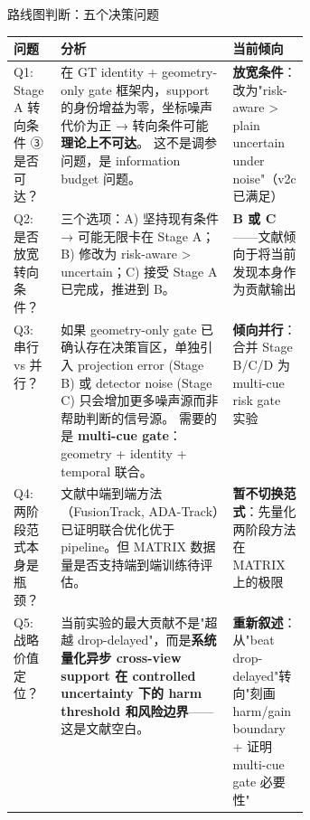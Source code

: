 \documentclass[aspectratio=169,xcolor=dvipsnames]{beamer}
\newcommand{\metric}[1]{\textbf{#1}}
\begin{document}

\begin{frame}{路线图判断：五个决策问题}
\scriptsize
\vspace{-2mm}
\begin{tabularx}{\linewidth}{p{0.16\linewidth} X p{0.22\linewidth}}
\toprule
问题 & 分析 & 当前倾向 \\
\midrule
Q1: Stage A 转向条件 ③ 是否可达？ &
在 GT identity + geometry-only gate 框架内，support 的身份增益为零，坐标噪声代价为正 → 转向条件可能\textbf{理论上不可达}。
这不是调参问题，是 information budget 问题。 &
\metric{放宽条件}：改为"risk-aware > plain uncertain under noise"（v2c 已满足） \\
\addlinespace
Q2: 是否放宽转向条件？ &
三个选项：A) 坚持现有条件 → 可能无限卡在 Stage A；B) 修改为 risk-aware > uncertain；C) 接受 Stage A 已完成，推进到 B。 &
\metric{B 或 C}——文献倾向于将当前发现本身作为贡献输出 \\
\addlinespace
Q3: 串行 vs 并行？ &
如果 geometry-only gate 已确认存在决策盲区，单独引入 projection error (Stage B) 或 detector noise (Stage C) 只会增加更多噪声源而非帮助判断的信号源。
需要的是 \textbf{multi-cue gate}：geometry + identity + temporal 联合。 &
\metric{倾向并行}：合并 Stage B/C/D 为 multi-cue risk gate 实验 \\
\addlinespace
Q4: 两阶段范式本身是瓶颈？ &
文献中端到端方法（FusionTrack, ADA-Track）已证明联合优化优于 pipeline。但 MATRIX 数据量是否支持端到端训练待评估。 &
\metric{暂不切换范式}：先量化两阶段方法在 MATRIX 上的极限 \\
\addlinespace
Q5: 战略价值定位？ &
当前实验的最大贡献不是"超越 drop-delayed"，而是\textbf{系统量化异步 cross-view support 在 controlled uncertainty 下的 harm threshold 和风险边界}——这是文献空白。 &
\metric{重新叙述}：从"beat drop-delayed"转向"刻画 harm/gain boundary + 证明 multi-cue gate 必要性" \\
\bottomrule
\end{tabularx}
\end{frame}

\end{document}
